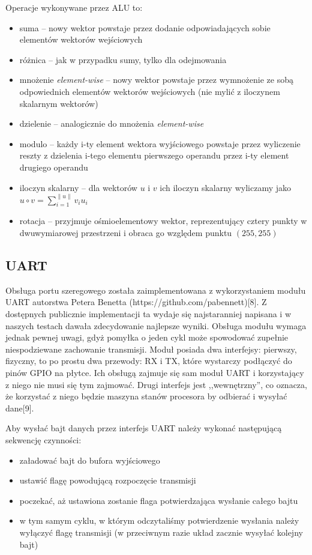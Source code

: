 Operacje wykonywane przez ALU to:
\begin{itemize}
  \item suma -- nowy wektor powstaje przez dodanie odpowiadających sobie elementów wektorów wejściowych
  \item różnica -- jak w przypadku sumy, tylko dla odejmowania
  \item mnożenie \textit{element-wise} -- nowy wektor powstaje przez wymnożenie ze sobą odpowiednich elementów wektorów wejściowych (nie mylić z iloczynem skalarnym wektorów)
  \item dzielenie -- analogicznie do mnożenia \textit{element-wise}
  \item modulo -- każdy i-ty element wektora wyjściowego powstaje przez wyliczenie reszty z dzielenia i-tego elementu pierwszego operandu przez i-ty element drugiego operandu
  \item iloczyn skalarny -- dla wektorów $u$ i $v$ ich iloczyn skalarny wyliczamy jako $u \circ v = \sum_{i=1}^{\|u\|} v_i u_i $
  \item rotacja -- przyjmuje ośmioelementowy wektor, reprezentujący cztery punkty w dwuwymiarowej przestrzeni i obraca go względem punktu $(255, 255)$
\end{itemize}

\subsection{UART}

Obsługa portu szeregowego została zaimplementowana z wykorzystaniem modułu UART autorstwa Petera Benetta (https://github.com/pabennett)[8]. Z dostępnych publicznie implementacji ta wydaje się najstaranniej napisana i w naszych testach dawała zdecydowanie najlepsze wyniki. Obsługa modułu wymaga jednak pewnej uwagi, gdyż pomyłka o jeden cykl może spowodować zupełnie niespodziewane zachowanie transmisji. Moduł posiada dwa interfejsy: pierwszy, fizyczny, to po prostu dwa przewody: RX i TX, które wystarczy podłączyć do pinów GPIO na płytce. Ich obsługą zajmuje się sam moduł UART i korzystający z niego nie musi się tym zajmować. Drugi interfejs jest ,,wewnętrzny'', co oznacza, że korzystać z niego będzie maszyna stanów procesora by odbierać i wysyłać dane[9].

Aby wysłać bajt danych przez interfejs UART należy wykonać następującą sekwencję czynności:
\begin{itemize}
  \item załadować bajt do bufora wyjściowego
  \item ustawić flagę powodującą rozpoczęcie transmisji
  \item poczekać, aż ustawiona zostanie flaga potwierdzająca wysłanie całego bajtu
  \item w tym samym cyklu, w którym odczytaliśmy potwierdzenie wysłania należy wyłączyć flagę transmisji (w przeciwnym razie układ zacznie wysyłać kolejny bajt)
\end{itemize}

